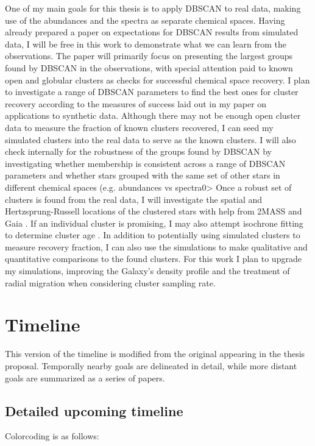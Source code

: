 \documentclass[11pt]{article}
\begin{document}
One of my main goals for this thesis is to apply DBSCAN to real data, making use of the abundances and the spectra as separate chemical spaces. Having already prepared a paper on expectations for DBSCAN results from simulated data, I will be free in this work to demonstrate what we can learn from the observations. The paper will primarily focus on presenting the largest groups found by DBSCAN in the observations, with special attention paid to known open and globular clusters as checks for successful chemical space recovery. I plan to investigate a range of DBSCAN parameters to find the best ones for cluster recovery according to the measures of success laid out in my paper on applications to synthetic data. Although there may not be enough open cluster data to measure the fraction of known clusters recovered, I can seed my simulated clusters into the real data to serve as the known clusters. I will also check internally for the robustness of the groups found by DBSCAN by investigating whether membership is consistent across a range of DBSCAN parameters and whether stars grouped with the same set of other stars in different chemical spaces (e.g. abundances vs spectra0> Once a robust set of clusters is found from the real data, I will investigate the spatial and Hertzsprung-Russell locations of the clustered stars with help from 2MASS \citep{Skrutskie2006} and Gaia \citep{GaiaCollaboration2016}. If an individual cluster is promising, I may also attempt isochrone fitting to determine cluster age \citep{Bressan2012}. In addition to potentially using simulated clusters to measure recovery fraction, I can also use the simulations to make qualitative and quantitative comparisons to the found clusters. For this work I plan to upgrade my simulations, improving the Galaxy's density profile and the treatment of radial migration when considering cluster sampling rate.


\section*{Timeline}

This version of the timeline is modified from the original appearing in the thesis proposal. Temporally nearby goals are delineated in detail, while more distant goals are summarized as a series of papers. 

\subsection*{Detailed upcoming timeline}
Colorcoding is as follows:
    
\end{document}
